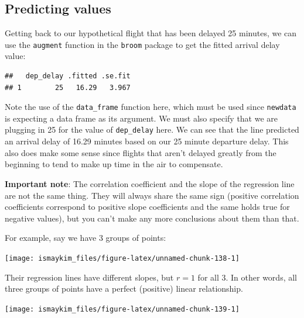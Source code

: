 \documentclass[]{tufte-book}
\newenvironment{Shaded}{\begin{snugshade}}{\end{snugshade}}
\newcommand{\KeywordTok}[1]{\textcolor[rgb]{0.13,0.29,0.53}{\textbf{{#1}}}}
\newcommand{\DataTypeTok}[1]{\textcolor[rgb]{0.13,0.29,0.53}{{#1}}}
\newcommand{\DecValTok}[1]{\textcolor[rgb]{0.00,0.00,0.81}{{#1}}}
\newcommand{\StringTok}[1]{\textcolor[rgb]{0.31,0.60,0.02}{{#1}}}
\newcommand{\NormalTok}[1]{{#1}}
\begin{document}
\subsection{Predicting values}\label{predicting-values}

Getting back to our hypothetical flight that has been delayed 25
minutes, we can use the \texttt{augment} function in the \texttt{broom}
package to get the fitted arrival delay value:

\begin{Shaded}
\end{Shaded}

\begin{verbatim}
##   dep_delay .fitted .se.fit
## 1        25   16.29   3.967
\end{verbatim}

Note the use of the \texttt{data\_frame} function here, which must be
used since \texttt{newdata} is expecting a data frame as its argument.
We must also specify that we are plugging in 25 for the value of
\texttt{dep\_delay} here. We can see that the line predicted an arrival
delay of 16.29 minutes based on our 25 minute departure delay. This also
does make some sense since flights that aren't delayed greatly from the
beginning to tend to make up time in the air to compensate.

\textbf{Important note}: The correlation coefficient and the slope of
the regression line are not the same thing. They will always share the
same sign (positive correlation coefficients correspond to positive
slope coefficients and the same holds true for negative values), but you
can't make any more conclusions about them than that.

For example, say we have 3 groups of points:

\begin{center}\texttt{[image: ismaykim\_files/figure-latex/unnamed-chunk-138-1]} \end{center}

Their regression lines have different slopes, but \(r = 1\) for all 3.
In other words, all three groups of points have a perfect (positive)
linear relationship.

\begin{center}\texttt{[image: ismaykim\_files/figure-latex/unnamed-chunk-139-1]} \end{center}
\end{document}
